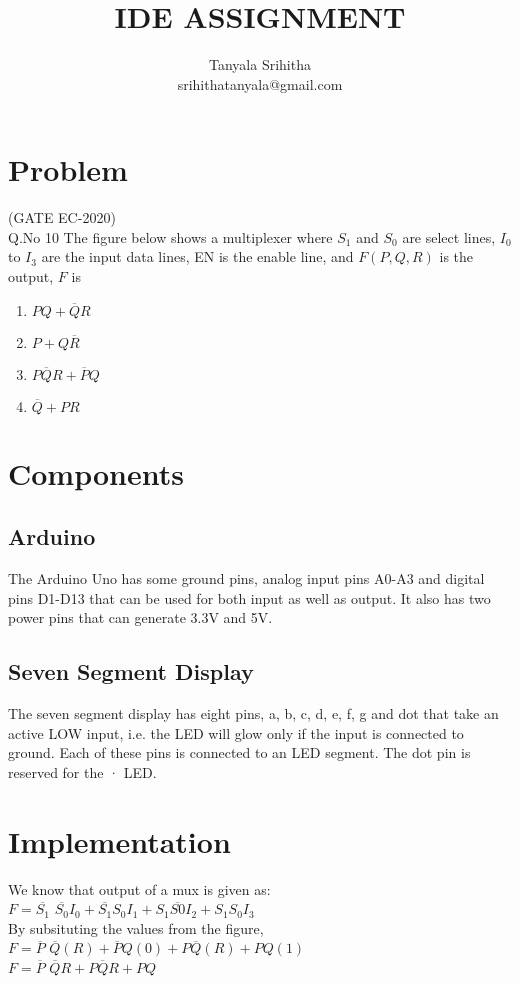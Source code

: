 \documentclass[journal,10pt, a4paper]{article}
\begin{document}
\lstset{ 
  language=C++,
  basicstyle=\ttfamily\footnotesize,
  breaklines=true,
  frame=lines}


\title{IDE ASSIGNMENT}
\author{Tanyala Srihitha\\srihithatanyala@gmail.com}
\maketitle
\tableofcontents 

\section{Problem}                               
(GATE EC-2020)\\                                  
Q.No 10    The figure below shows a multiplexer where $S_1$ and $S_0$ are select lines, $I_0$ to $I_3$ are the input data lines, EN is the enable line, and $F(P,Q,R)$ is the output, $F$ is

\begin{enumerate}
   \item $PQ + \overline{Q} R$
   \item $P+Q \overline{R}$
   \item $P \overline{Q} R+\overline{P}Q$
   \item $\overline{Q} +PR$
\end{enumerate}

\section{Components}


\subsection{Arduino}
The Arduino Uno has some ground pins, analog input pins A0-A3 and digital pins D1-D13 that can be used for both input as well as output. It also has two power pins that can generate 3.3V and 5V.
\subsection{Seven Segment Display}
The seven segment display has eight pins, a, b, c, d, e, f, g and dot that take an active LOW input, i.e. the LED will glow only if the input is connected to ground. Each of these pins is connected to an LED segment. The dot pin is reserved for the · LED.

\section{Implementation}
\begin{spacing}{1.5}
We know that output of a mux is given as:\\
$F=\overline{S_1}$ $\overline{S_0}I_0+\overline{S_1}S_0I_1+S_1\overline{S0}I_2+S_1S_0I_3$\\
By subsituting the values from the figure,\\
$F=\overline{P}$ $\overline{Q}(R)+\overline{P}Q(0)+P\overline{Q}(R)+PQ(1)$\\
$F=\overline{P}$ $\overline{Q}R+P\overline{Q}R+PQ$
\end{spacing}
\end{document}
